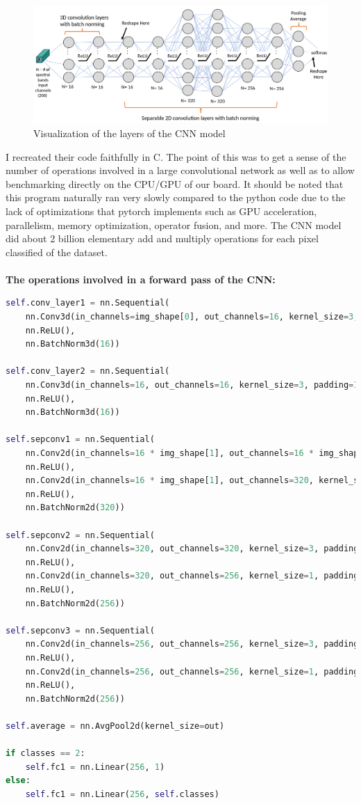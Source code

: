 \documentclass{article}
\begin{document}
\begin{figure}[H]
\centering
\includegraphics[scale=0.25]{cnn_arch.png}
\caption{Visualization of the layers of the CNN model \cite{dirk-presentation}}
\end{figure}

I recreated their code faithfully in C. The point of this was to get a sense of the number of operations involved in a large convolutional network as well as to allow benchmarking directly on the CPU/GPU of our board. It should be noted that this program naturally ran very slowly compared to the python code due to the lack of optimizations that pytorch implements such as GPU acceleration, parallelism, memory optimization, operator fusion, and more. The CNN model did about 2 billion elementary add and multiply operations for each pixel classified of the dataset.\\\\
\textbf{The operations involved in a forward pass of the CNN:}
\begin{lstlisting}[language=python]
self.conv_layer1 = nn.Sequential(
    nn.Conv3d(in_channels=img_shape[0], out_channels=16, kernel_size=3, padding=1),
    nn.ReLU(),
    nn.BatchNorm3d(16))

self.conv_layer2 = nn.Sequential(
    nn.Conv3d(in_channels=16, out_channels=16, kernel_size=3, padding=1),
    nn.ReLU(),
    nn.BatchNorm3d(16))

self.sepconv1 = nn.Sequential(
    nn.Conv2d(in_channels=16 * img_shape[1], out_channels=16 * img_shape[1], kernel_size=5, padding=2, groups=16 * img_shape[1]),
    nn.ReLU(),
    nn.Conv2d(in_channels=16 * img_shape[1], out_channels=320, kernel_size=1, padding=0),
    nn.ReLU(),
    nn.BatchNorm2d(320))

self.sepconv2 = nn.Sequential(
    nn.Conv2d(in_channels=320, out_channels=320, kernel_size=3, padding=1, stride=stride, groups=320),
    nn.ReLU(),
    nn.Conv2d(in_channels=320, out_channels=256, kernel_size=1, padding=0),
    nn.ReLU(),
    nn.BatchNorm2d(256))

self.sepconv3 = nn.Sequential(
    nn.Conv2d(in_channels=256, out_channels=256, kernel_size=3, padding=1, stride=stride, groups=256),
    nn.ReLU(),
    nn.Conv2d(in_channels=256, out_channels=256, kernel_size=1, padding=0),
    nn.ReLU(),
    nn.BatchNorm2d(256))

self.average = nn.AvgPool2d(kernel_size=out)

if classes == 2:
    self.fc1 = nn.Linear(256, 1)
else:
    self.fc1 = nn.Linear(256, self.classes)
\end{lstlisting}
\end{document}
